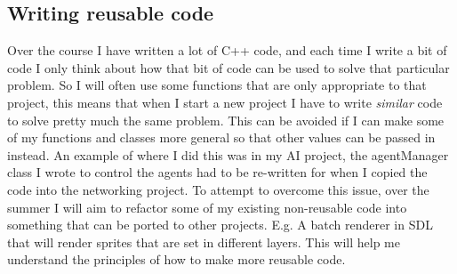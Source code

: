 \documentclass{scrartcl}
\begin{document}
\subsection{Writing reusable code}
Over the course I have written a lot of C++ code, and each time I write a bit of code I only think about how that bit of code can be used to solve that particular problem. So I will often use some functions that are only appropriate to that project, this means that when I start a new project I have to write \textit{similar} code to solve pretty much the same problem. This can be avoided if I can make some of my functions and classes more general so that other values can be passed in instead. An example of where I did this was in my AI project, the agentManager class I wrote to control the agents had to be re-written for when I copied the code into the networking project.
To attempt to overcome this issue, over the summer I will aim to refactor some of my existing non-reusable code into something that can be ported to other projects. E.g. A batch renderer in SDL that will render sprites that are set in different layers. This will help me understand the principles of how to make more reusable code.
\end{document}
